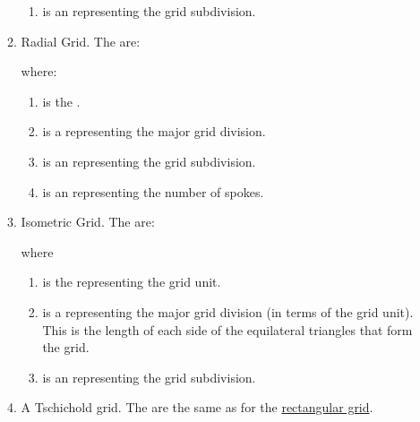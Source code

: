 \begin{numbered}
\begin{enumerate}
\begin{enumerate}
\begin{enumerate}
       \item {} is an  representing the grid subdivision.

     \end{enumerate}

     \item Radial Grid. The  are:
    \begin{syntaxline}
       
    \end{syntaxline}
    where:
      \begin{enumerate}
       \item {} is the .

       \item {} is a  representing the major grid division.

       \item {} is an  representing the grid subdivision.

       \item {} is an  representing the number of spokes.
      \end{enumerate}

     \item Isometric Grid. The  are:
    \begin{syntaxline}
      
    \end{syntaxline}
    where
      \begin{enumerate}
       \item {} is the  representing the grid unit.

       \item {} is a  representing the major
        grid division (in terms of the grid unit). This is the
length of each side of the equilateral triangles that form the grid.

       \item {} is an  representing the grid subdivision.
      \end{enumerate}
 
    \item A Tschichold grid. The
      are the same as for the 
     \hyperref[jdr:rectgrid]{rectangular grid}.


\end{enumerate}
\end{enumerate}
\end{numbered}
